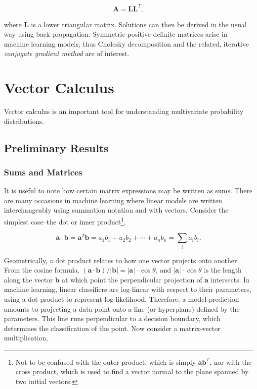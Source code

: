 \documentclass[11pt]{amsart}
\begin{document}
$$\mathbf{A} = \mathbf{L}\mathbf{L}^T,$$

where $\mathbf{L}$ is a lower triangular matrix. Solutions can then be derived in the usual way using back-propagation. Symmetric positive-definite matrices arise in machine learning models, thus Cholesky decomposition and the related, iterative \emph{conjugate gradient method} are of interest.

\section{Vector Calculus}

Vector calculus is an important tool for understanding multivariate probability distributions.

\subsection{Preliminary Results}

\subsubsection{Sums and Matrices}

It is useful to note how certain matrix expressions may be written as sums. There are many occasions in machine learning where linear models are written interchangeably using summation notation and with vectors. Consider the simplest case--the dot or inner product\footnote{Not to be confused with the outer product, which is simply $\mathbf{a}\mathbf{b}^T$, nor with the cross product, which is used to find a vector normal to the plane spanned by two initial vectors.},

$$\mathbf{a}\cdot\mathbf{b} = \mathbf{a}^T\mathbf{b} = a_1b_1 + a_2b_2 + \cdots + a_nb_n = \sum_i a_ib_i.$$

Geometrically, a dot product relates to how one vector projects onto another. From the cosine formula, $(\mathbf{a}\cdot\mathbf{b})/|\mathbf{b}| = |\mathbf{a}|\cdot\cos\theta$, and $|\mathbf{a}|\cdot\cos\theta$ is the length along the vector $\mathbf{b}$ at which point the perpendicular projection of $\mathbf{a}$ intersects. In machine learning, linear classifiers are log-linear with respect to their parameters, using a dot product to represent log-likelihood. Therefore, a model prediction amounts to projecting a data point onto a line (or hyperplane) defined by the parameters. This line runs perpendicular to a decision boundary, which determines the classification of the point. Now consider a matrix-vector multiplication,
\end{document}
